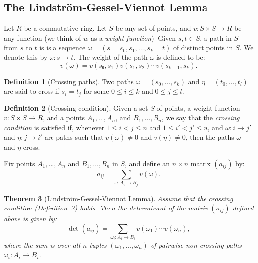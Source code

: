 \documentclass[11pt]{amsproc}
\newtheorem{theorem}{Theorem}[subsection]
\theoremstyle{definition}
\newtheorem{definition}[theorem]{Definition}
\theoremstyle{example}
\begin{document}
\subsection{The Lindstr\"om-Gessel-Viennot Lemma}
\label{sec:lgv}
Let $R$ be a commutative ring.
Let $S$ be any set of points, and $v:S\times S\to R$ be any function (we think of $w$ as a \emph{weight function}).
Given $s, t\in S$, a path in $S$ from $s$ to $t$ is is a sequence $\omega=(s=s_0,s_1,\dotsc,s_k=t)$ of distinct points in $S$.
We denote this by $\omega:s\to t$.
The weight of the path $\omega$ is defined to be:
\begin{displaymath}
  v(\omega) = v(s_0,s_1)v(s_1,s_2)\dotsb v(s_{k-1}, s_k).
\end{displaymath}
\begin{definition}
  [Crossing paths]
  Two paths $\omega=(s_0,\dotsc, s_k)$ and $\eta=(t_0,\dotsc,t_l)$ are said to cross if $s_i= t_j$ for some $0\leq i \leq k$ and $0\leq j \leq l$.
\end{definition}
\begin{definition}
  [Crossing condition]
  \label{definition:crossing-condition}
  Given a set $S$ of points, a weight function $v:S\times S\to R$, and a points $A_1,\dotsc,A_n$, and $B_1,\dotsc, B_n$, we say that the \emph{crossing condition} is satisfied if, whenever $1\leq i<j\leq n$ and $1\leq i'<j'\leq n$, and $\omega:i \to j'$ and $\eta: j\to i'$ are paths such that $v(\omega)\neq 0$ and $v(\eta)\neq 0$, then the paths $\omega$ and $\eta$ cross.
\end{definition}
Fix points $A_1,\dotsc, A_n$ and $B_1,\dotsc, B_n$ in $S$, and define an $n\times n$ matrix $(a_{ij})$ by:
\begin{displaymath}
  a_{ij} = \sum_{\omega:A_i\to B_j} v(\omega).
\end{displaymath}
\begin{theorem}
  [Lindstr\"om-Gessel-Viennot Lemma]
  \label{lemma:lgv}
  Assume that the crossing condition (Definition~\ref{definition:crossing-condition}) holds.
  Then the determinant of the matrix $(a_{ij})$ defined above is given by:
  \begin{equation}
    \label{eq:lgv}
    \det(a_{ij}) = \sum_{\omega_i:A_i\to B_i} v(\omega_1)\dotsb v(\omega_n),
  \end{equation}
  where the sum is over all $n$-tuples $(\omega_1,\dotsc, \omega_n)$ of pairwise non-crossing paths $\omega_i:A_i\to B_i$.
\end{theorem}
\end{document}
